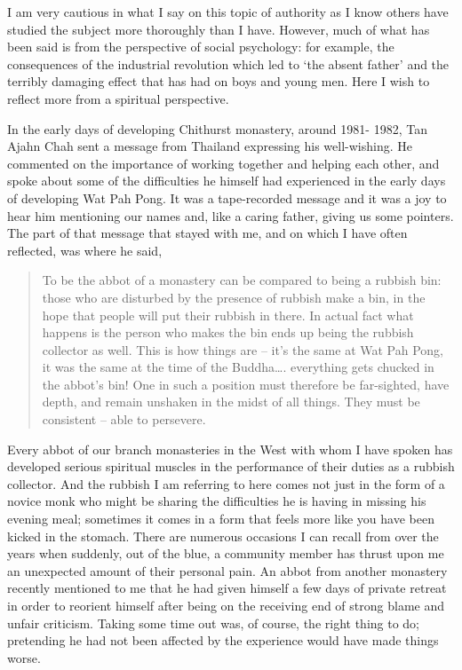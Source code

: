 I am very cautious in what I say on this topic of authority as I know
others have studied the subject more thoroughly than I have. However,
much of what has been said is from the perspective of social psychology:
for example, the consequences of the industrial revolution which led to
`the absent father' and the terribly damaging effect that has had on
boys and young men. Here I wish to reflect more from a spiritual
perspective.

In the early days of developing Chithurst monastery, around 1981- 1982,
Tan Ajahn Chah sent a message from Thailand expressing his well-wishing.
He commented on the importance of working together and helping each
other, and spoke about some of the difficulties he himself had
experienced in the early days of developing Wat Pah Pong. It was a
tape-recorded message and it was a joy to hear him mentioning our names
and, like a caring father, giving us some pointers. The part of that
message that stayed with me, and on which I have often reflected, was
where he said,

\begin{quotation}
To be the abbot of a monastery can be compared to being a rubbish bin:
those who are disturbed by the presence of rubbish make a bin, in the
hope that people will put their rubbish in there. In actual fact what
happens is the person who makes the bin ends up being the rubbish
collector as well. This is how things are -- it's the same at Wat Pah
Pong, it was the same at the time of the Buddha\ldots. everything gets
chucked in the abbot's bin! One in such a position must therefore be
far-sighted, have depth, and remain unshaken in the midst of all things.
They must be consistent -- able to persevere.\cite{seeing}
\end{quotation}

Every abbot of our branch monasteries in the West with whom I have
spoken has developed serious spiritual muscles in the performance of
their duties as a rubbish collector. And the rubbish I am referring to
here comes not just in the form of a novice monk who might be sharing
the difficulties he is having in missing his evening meal; sometimes it
comes in a form that feels more like you have been kicked in the
stomach. There are numerous occasions I can recall from over the years
when suddenly, out of the blue, a community member has thrust upon me an
unexpected amount of their personal pain. An abbot from another
monastery recently mentioned to me that he had given himself a few days
of private retreat in order to reorient himself after being on the
receiving end of strong blame and unfair criticism. Taking some time out
was, of course, the right thing to do; pretending he had not been
affected by the experience would have made things worse.

